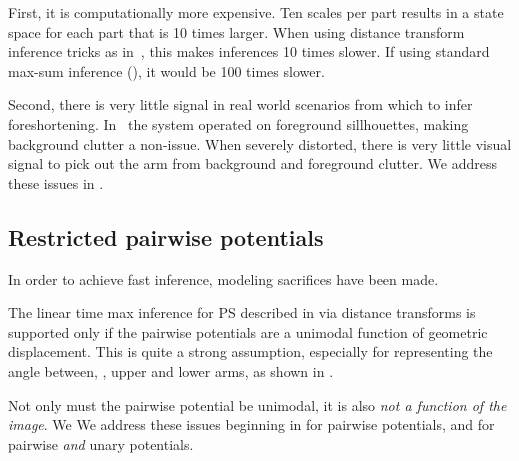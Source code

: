  First, it is computationally more expensive.  Ten scales per part results in a 
state space for each part that is 10 times larger.  When using distance 
transform inference tricks as in~, this makes inferences 10 times 
slower.  If using standard max-sum inference (), it 
would be 100 times slower.   

Second, there is very little signal in real world scenarios from which to infer 
foreshortening.  In~\citet{felz05} the system operated on foreground 
sillhouettes, making background clutter a non-issue.  When severely distorted, 
there is very little visual signal to pick out the arm from background and 
foreground clutter.  We address these issues in .

\subsection{Restricted pairwise potentials}

In order to achieve fast inference, modeling sacrifices have been made.

 The linear time max inference for PS described in 
 via distance transforms is supported only if the pairwise 
potentials are a unimodal function of geometric displacement.  This is quite a 
strong assumption, especially for representing the angle between, \eg, upper 
and lower arms, as shown in . 

 Not only must the pairwise potential be unimodal, it 
is also {\em not a function of the image}.  We  
We address these issues beginning in  for pairwise potentials, and 
 for pairwise {\em and} unary potentials.



